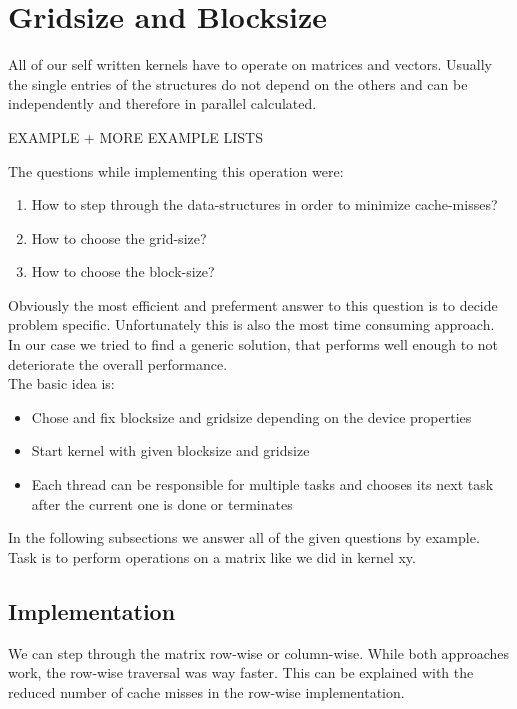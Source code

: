 \section{Gridsize and Blocksize}
All of our self written kernels have to operate on matrices and vectors. Usually the single entries of the structures do not depend on the others and can be independently and therefore in parallel calculated.
\begin{center}
	EXAMPLE + MORE EXAMPLE LISTS
\end{center}
The questions while implementing this operation were:
\begin{enumerate}
	\item How to step through the data-structures in order to minimize cache-misses?
	\item How to choose the grid-size?
	\item How to choose the block-size?
\end{enumerate}

Obviously the most efficient and preferment answer to this question is to decide problem specific. Unfortunately this is also the most time consuming approach.\\
In our case we tried to find a generic solution, that performs well enough to not deteriorate the overall performance. \\

The basic idea is:
\begin{itemize}
	\item Chose and fix blocksize and gridsize depending on the device properties
	\item Start kernel with given blocksize and gridsize
	\item Each thread can be responsible for multiple tasks and chooses its next task after the current one is done or terminates
\end{itemize}

In the following subsections we answer all of the given questions by example.
Task is to perform operations on a matrix like we did in kernel xy.

\subsection{Implementation}

We can step through the matrix row-wise or column-wise. While both approaches work, the row-wise traversal was way faster. This can be explained with the reduced number of cache misses in the row-wise implementation.

